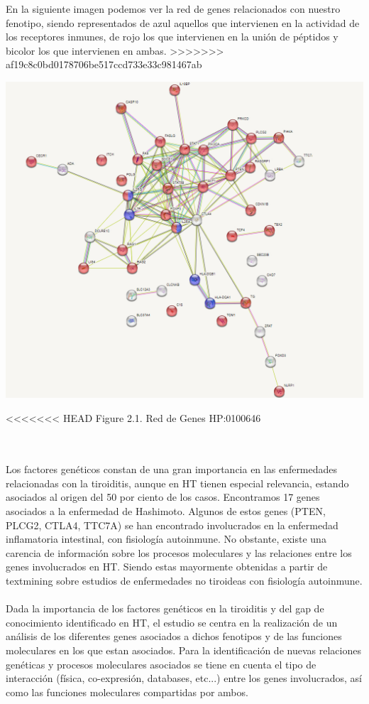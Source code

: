 En la siguiente imagen podemos ver la red de genes relacionados con nuestro fenotipo, siendo representados de azul aquellos que intervienen en la actividad de los receptores inmunes, de rojo los que intervienen en la unión de péptidos y bicolor los que intervienen en ambas.
>>>>>>> af19c8c0bd0178706be517ccd733e33c981467ab
\begin{center}
 
    \includegraphics[scale=0.4]{figures/red de genes.png}
    
<<<<<<< HEAD
    Figure 2.1. Red de Genes HP:0100646
\end{center}
\\ \\ 
\vspace{5mm}
Los factores genéticos constan de una gran importancia en las enfermedades relacionadas con la tiroiditis, aunque en HT tienen especial relevancia, estando asociados al origen del 50 por ciento de los casos.\cite{Zheng2020} Encontramos 17 genes asociados a la enfermedad de Hashimoto. Algunos de estos genes (PTEN, PLCG2, CTLA4, TTC7A) se han encontrado involucrados en la enfermedad inflamatoria intestinal, con fisiología autoinmune. No obstante, existe una carencia de información sobre los procesos moleculares y las relaciones entre los genes involucrados en HT. Siendo estas mayormente obtenidas a partir de textmining sobre estudios de enfermedades no tiroideas con fisiología autoinmune. \cite{StringHP:0000872}
\\ \\  
Dada la importancia de los factores genéticos en la tiroiditis y del gap de conocimiento identificado en HT, el estudio se centra en la realización de un análisis de los diferentes genes asociados a dichos fenotipos y de las funciones moleculares en los que estan asociados. Para la identificación de nuevas relaciones genéticas y procesos moleculares asociados se tiene en cuenta el tipo de interacción (física, co-expresión, databases, etc...) entre los genes involucrados, así como las funciones moleculares compartidas por ambos.





